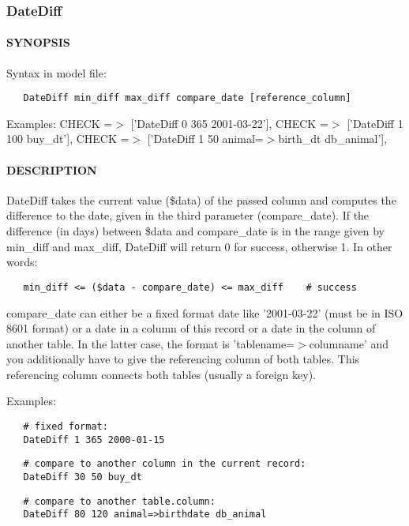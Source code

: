 \subsubsection{DateDiff\label{DateDiff}}




\paragraph*{SYNOPSIS\label{DateDiff_SYNOPSIS}}


Syntax in model file:

\begin{verbatim}
   DateDiff min_diff max_diff compare_date [reference_column]
\end{verbatim}


Examples:
   CHECK =$>$ ['DateDiff 0 365 2001-03-22'],
   CHECK =$>$ ['DateDiff 1 100 buy\_dt'],
   CHECK =$>$ ['DateDiff 1 50  animal=$>$birth\_dt db\_animal'],

\paragraph*{DESCRIPTION\label{DateDiff_DESCRIPTION}}


DateDiff takes the current value (\$data) of the passed column and computes the difference to the
date, given in the third parameter (compare\_date). If the difference (in
days) between \$data and compare\_date is in the range given by min\_diff and
max\_diff, DateDiff will return 0 for success, otherwise 1. In other words:

\begin{verbatim}
   min_diff <= ($data - compare_date) <= max_diff    # success
\end{verbatim}


compare\_date can either be a fixed format date like '2001-03-22' (must be
in ISO 8601 format) or a date in a column of this record or a date in the
column of another table.  In the latter case, the format is
'tablename=$>$columname' and you additionally have to give the referencing
column of both tables. This referencing column connects both tables
(usually a foreign key).



Examples:

\begin{verbatim}
   # fixed format:
   DateDiff 1 365 2000-01-15
\end{verbatim}
\begin{verbatim}
   # compare to another column in the current record:
   DateDiff 30 50 buy_dt
\end{verbatim}
\begin{verbatim}
   # compare to another table.column:
   DateDiff 80 120 animal=>birthdate db_animal
\end{verbatim}
